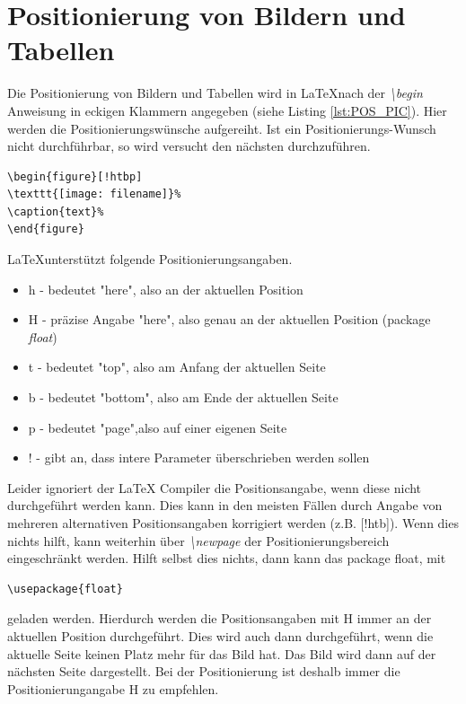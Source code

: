 \documentclass[SSS_Laborbericht.tex]{subfiles}
\begin{document}
\section{Positionierung von Bildern und Tabellen}
Die Positionierung von Bildern und Tabellen wird in \LaTeX nach der \textit{\textbackslash begin} Anweisung in eckigen Klammern angegeben (siehe Listing \ref{lst:POS_PIC}). Hier werden die Positionierungswünsche aufgereiht. Ist ein Positionierungs-Wunsch nicht durchführbar, so wird versucht den nächsten durchzuführen.

\begin{lstlisting}[style=LATEX, frame=single, caption=Positionierung von Bildern , captionpos=b, label=lst:POS_PIC, numbers=none]
\begin{figure}[!htbp]
\texttt{[image: filename]}%
\caption{text}%
\end{figure}
\end{lstlisting}

\LaTeX unterstützt folgende Positionierungsangaben.
\begin{itemize}
	\item h -  bedeutet "here", also an der aktuellen Position
	\item H -  präzise Angabe "here", also genau an der aktuellen Position (package \textit{float})
	\item t -  bedeutet "top", also am Anfang der aktuellen Seite
	\item b -  bedeutet "bottom", also am Ende der aktuellen Seite
	\item p -  bedeutet "page",also auf einer eigenen Seite
	\item ! -  gibt an, dass intere Parameter überschrieben werden sollen
\end{itemize}

Leider ignoriert der LaTeX Compiler die Positionsangabe, wenn diese nicht durchgeführt werden kann. Dies kann in den meisten Fällen durch Angabe von mehreren alternativen Positionsangaben korrigiert werden (z.B. [!htb]). Wenn dies nichts hilft, kann weiterhin über \textit{\textbackslash newpage}  der Positionierungsbereich eingeschränkt werden. Hilft selbst dies nichts, dann kann das package float, mit
\begin{lstlisting}[style=LATEX, numbers=none]
\usepackage{float}
\end{lstlisting}
geladen werden. Hierdurch werden die Positionsangaben mit H immer an der aktuellen Position durchgeführt. Dies wird auch dann durchgeführt, wenn die aktuelle Seite keinen Platz mehr für das Bild hat. Das Bild wird dann auf der nächsten Seite dargestellt. Bei der Positionierung ist deshalb immer die Positionierungangabe H zu empfehlen.
\end{document}
